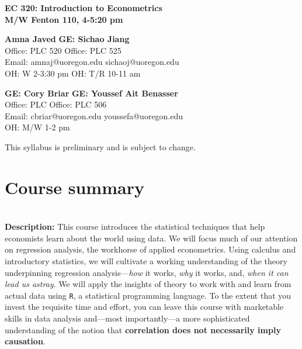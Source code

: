 \documentclass[11pt]{article}
\begin{document}
\begin{center}
\textbf{\Large EC 320: Introduction to Econometrics\\
M/W Fenton 110, 4-5:20 pm }
\end{center}

\vspace{0.2in}

 \textbf{\large Amna Javed }
  \hfill  
 \textbf{ \large GE: Sichao Jiang} \\  
 \large Office: PLC 520
 \hfill 
 \large Office: PLC 525\\
  \large Email: amnaj@uoregon.edu 
 \hfill 
 \large sichaoj@uoregon.edu \\ 
 \large OH: W 2-3:30 pm 
 \hfill 
  \large OH: T/R 10-11 am

\bigskip

 \textbf{\large GE: Cory Briar}
  \hfill  
 \textbf{ \large GE: Youssef Ait Benasser} \\  
 \large Office: PLC 
 \hfill 
 \large Office: PLC 506\\
  \large Email:  cbriar@uoregon.edu
 \hfill 
 \large   youssefa@uoregon.edu \\ 
 \large OH: M/W 1-2 pm
 \hfill 
 
\vspace{5mm}

\begin{center}  This syllabus is preliminary and is subject to change.  \\
\end{center}


\section*{Course summary}

\textbf {\large \\ Description:} This course introduces the statistical techniques that help economists learn about the world using data. We will focus much of our attention on regression analysis, the workhorse of applied econometrics. Using calculus and introductory statistics, we will cultivate a working understanding of the theory underpinning regression analysis---\textit{how} it works, \textit{why} it works, and, \textit{when it can lead us astray}. We will apply the insights of theory to work with and learn from actual data using \texttt{{R}}, a statistical programming language. To the extent that you invest the requisite time and effort, you can leave this course with marketable skills in data analysis and---most importantly---a more sophisticated understanding of the notion that \textbf{correlation does not necessarily imply causation}. 
\end{document}
